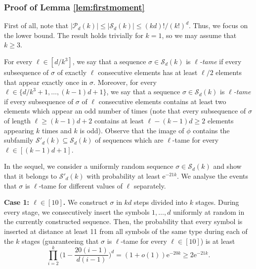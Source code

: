 \documentclass[reqno,final,a4paper]{amsart}
\theoremstyle{definition}
\newcommand{\cS}{\mathcal{S}}
\def\e{\mathrm{e}}
\newcommand{\1}{\mathbbm{1}}
\begin{document}
\subsubsection{Proof of Lemma \ref{lem:firstmoment}}\label{subsec:firstmoment} 
First of all, note that $|\mathcal{P}_d(k)|\leq |\mathcal{S}_d(k)|\le (kd)!/(k!)^d$. Thus, we focus on the lower bound. The result holds trivially for $k=1$, so we may assume that $k\ge 3$.

For every $\ell\in[d/k^3]$, we say that a sequence $\sigma\in \mathcal{S}_d(k)$ is \emph{$\ell$-tame} if every subsequence of $\sigma$ of exactly $\ell$ consecutive elements has at least $\ell/2$ elements that appear exactly once in $\sigma$. 
Moreover, for every $\ell\in\{d/k^3+1,\ldots,(k-1)d+1\}$, we say that a sequence $\sigma \in \mathcal{S}_d(k)$ is \emph{$\ell$-tame} if every subsequence of $\sigma$ of $\ell$ consecutive elements contains at least two elements which appear an odd number of times (note that every subsequence of $\sigma$ of length  $\ell\ge (k-1)d+2$ contains at least $\ell-(k-1)d\geq 2$ elements appearing $k$ times and $k$ is odd).
Observe that the image of $\phi$ contains the subfamily $\cS'_d(k)\subseteq \mathcal{S}_d(k)$ of sequences which are $\ell$-tame for every $\ell \in [(k-1)d+1]$.

In the sequel, we consider a uniformly random sequence $\sigma\in \cS_d(k)$ and show that it belongs to $\cS'_d(k)$ with probability at least $\e^{-21k}$.
We analyse the events that $\sigma$ is $\ell$-tame for different values of $\ell$ separately.

\vspace{0.5em}
\noindent
\textbf{Case 1: $\ell\in [10]$.} 
We construct $\sigma$ in $kd$ steps divided into $k$ stages. During every stage, we consecutively insert the symbols $1,\ldots,d$ uniformly at random in the currently constructed sequence. 
Then, the probability that every symbol is inserted at distance at least 11 from all symbols of the same type during each of the $k$ stages (guaranteeing that $\sigma$ is $\ell$-tame for every $\ell\in [10]$) is at least
\[\prod_{i=2}^k \bigg(1-\frac{20(i-1)}{d(i-1)}\bigg)^d = (1+o(1)) \e^{-20k}\ge 2\e^{-21k}.\]
\end{document}
